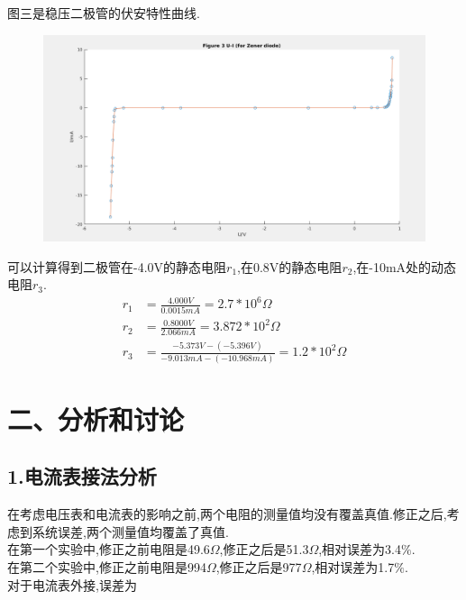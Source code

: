 \documentclass[a4paper,10pt,notitlepage]{report}
\begin{document}
	图三是稳压二极管的伏安特性曲线. \\
	
\begin{figure}
\centering
	\includegraphics[scale=0.3]{diode.png}
\end{figure}

	可以计算得到二极管在-4.0V的静态电阻$r_1$,在0.8V的静态电阻$r_2$,在-10mA处的动态电阻$r_3$. \\
	
\begin{align}
	r_1 &= \frac{4.000V}{0.0015mA} = 2.7 * 10^6 \Omega \\
	r_2 &= \frac{0.8000V}{2.066mA} = 3.872 * 10^2 \Omega \\
	r_3 &= \frac{-5.373 V - (-5.396 V)}{-9.013mA - (-10.968mA)} = 1.2 * 10^2 \Omega
\end{align}

\section*{二、分析和讨论}
\subsection*{1.电流表接法分析}
	
	在考虑电压表和电流表的影响之前,两个电阻的测量值均没有覆盖真值.修正之后,考虑到系统误差,两个测量值均覆盖了真值. \\
	
	在第一个实验中,修正之前电阻是49.6$\Omega$,修正之后是51.3$\Omega$,相对误差为3.4$\%$. \\
	
	在第二个实验中,修正之前电阻是994$\Omega$,修正之后是977$\Omega$,相对误差为1.7$\%$. \\
	
	对于电流表外接,误差为
	
\end{document}
